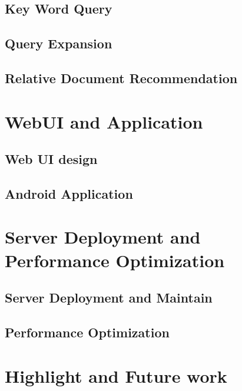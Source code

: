 \documentclass[conference]{IEEEtran}
\begin{document}
\subsection{Key Word Query}

\subsection{Query Expansion}

\subsection{Relative Document Recommendation}

\section{WebUI and Application}
\subsection{Web UI design}
\subsection{Android Application}

\section{Server Deployment and Performance Optimization}
\subsection{Server Deployment and Maintain}

\subsection{Performance Optimization}

\section{Highlight and Future work}
\end{document}
